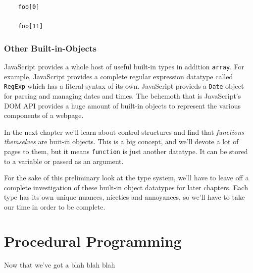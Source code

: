 \documentclass[11pt,letter]{book}
\begin{document}
    \begin{verbatim}
    foo[0]
    
    foo[11]
    \end{verbatim}
    
    \subsection{Other Built-in-Objects}
    JavaScript provides a whole host of useful built-in types in addition \texttt{array}. For 
    example, JavaScript provides a complete regular expression datatype called \texttt{RegExp} which
    has a literal syntax of its own. JavaScript provieds a \texttt{Date} object for parsing and 
    managing dates and times. The behemoth that is JavaScript's DOM API provides a huge amount of 
    built-in objects to represent the various components of a webpage.
    
    In the next chapter we'll learn about control structures and find that \emph{functions 
    themselves} are buit-in objects. This is a big concept, and we'll devote a lot of pages to them,
    but it means \texttt{function} is just another datatype. It can be stored to a variable or 
    passed as an argument.
    
    For the sake of this preliminary look at the type system, we'll have to leave off a complete 
    investigation of these built-in object datatypes for later chapters. Each type has its own 
    unique nuances, niceties and annoyances, so we'll have to take our time in order to be complete.
    
    \chapter{Procedural Programming}
    Now that we've got a blah blah blah
    
\end{document}
